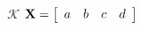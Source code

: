 \documentclass[varwidth, border=5pt]{standalone}
\begin{document}
$\mathcal{K}$
\begin{math}
\mathbf{X}=
\left[
\begin{array}{l l l l}
a & b & c & d
\end{array}
\right]
\end{math}
\end{document}

